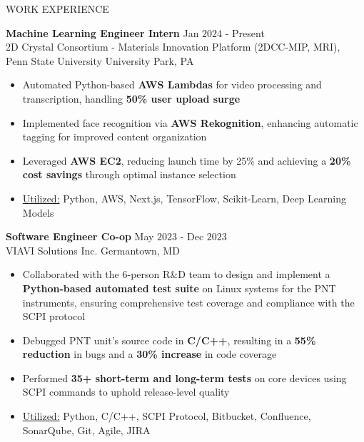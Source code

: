 \documentclass{resume} %
\begin{document}
\begin{rSection}{WORK EXPERIENCE}

{\bf Machine Learning Engineer Intern} \hfill Jan $2024$ - Present\\
2D Crystal Consortium - Materials Innovation Platform (2DCC-MIP, MRI), Penn State University \hfill University Park, PA
\begin{itemize}[itemsep = -4pt]
    \item Automated Python-based {\bf AWS Lambdas} for video processing and transcription, handling {\bf 50\% user upload surge}
    \item Implemented face recognition via {\bf AWS Rekognition}, enhancing automatic tagging for improved content organization
    \item Leveraged {\bf AWS EC2}, reducing launch time by 25\% and achieving a {\bf 20\% cost savings} through optimal instance selection
    \item \underline{Utilized:} Python, AWS, Next.js, TensorFlow, Scikit-Learn, Deep Learning Models 
\end{itemize}

{\bf Software Engineer Co-op} \hfill May $2023$ - Dec $2023$\\
VIAVI Solutions Inc. \hfill Germantown, MD
\begin{itemize}[itemsep = -4pt]
    \item Collaborated with the $6$-person R\&D team to design and implement a {\bf Python-based automated test suite} on Linux systems for the PNT instruments, ensuring comprehensive test coverage and compliance with the SCPI protocol
    \item Debugged PNT unit's source code in {\bf C/C++}, resulting in a {\bf 55\% reduction} in bugs and a {\bf 30\% increase} in code coverage
    \item Performed {\bf 35+ short-term and long-term tests} on core devices using SCPI commands to uphold release-level quality
    \item \underline{Utilized:} Python, C/C++, SCPI Protocol, Bitbucket, Confluence, SonarQube, Git, Agile, JIRA
\end{itemize}


\end{rSection}
\end{document}
